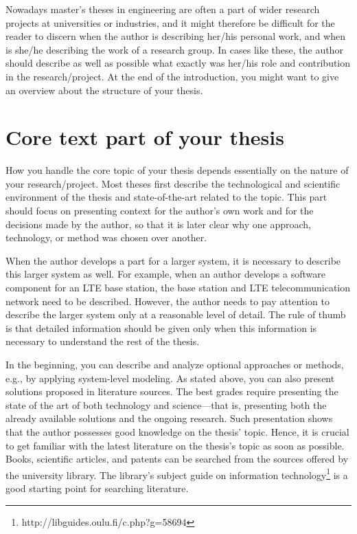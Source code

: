 Nowadays master’s theses in engineering are often a part of wider research projects at universities or industries, and it might therefore be difficult for the reader to discern when the author is describing her/his personal work, and when is she/he describing the work of a research group. In cases like these, the author should describe as well as possible what exactly was her/his role and contribution in the research/project. At the end of the introduction, you might want to give an overview about the structure of your thesis.

\section{Core text part of your thesis}
\DIFaddbegin \label{sec:core_text}
\DIFaddend 

How you handle the core topic of your thesis depends essentially on the nature of your research/project. Most theses first describe the technological and scientific environment of the thesis and state-of-the-art related to the topic. This part should focus on presenting context for the author’s own work and for the decisions made by the author, so that it is later clear why one approach, technology, or method was chosen over another.

When the author develops a part for a larger system, it is necessary to describe this larger system as well. For example, when an author develops a software component for an LTE base station, the base station and LTE telecommunication network need to be described. However, the author needs to pay attention to describe the larger system only at a reasonable level of detail. The rule of thumb is that detailed information should be given only when this information is necessary to understand the rest of the thesis.

In the beginning, you can describe and analyze optional approaches or methods, e.g., by applying system-level modeling. As stated above, you can also present solutions proposed in literature sources. The best grades require presenting the state of the art of both technology and science---that is, presenting both the already available solutions and the ongoing research. Such presentation shows that the author possesses good knowledge on the thesis’ topic. Hence, it is crucial to get familiar with the latest literature on the thesis’s topic as soon as possible. Books, scientific articles, and patents can be searched from the sources offered by the university library. The library’s subject guide on information technology\footnote{ http://libguides.oulu.fi/c.php?g=58694} is a good starting point for searching literature.

